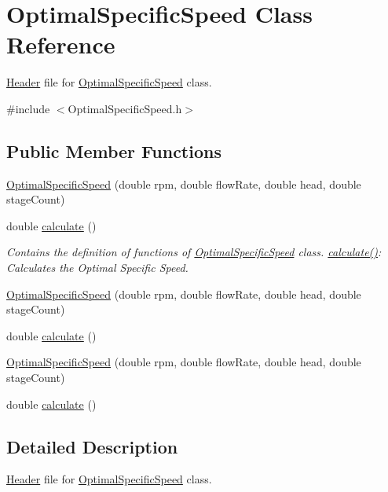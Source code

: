 \hypertarget{class_optimal_specific_speed}{}\section{Optimal\+Specific\+Speed Class Reference}
\label{class_optimal_specific_speed}


\hyperlink{class_header}{Header} file for \hyperlink{class_optimal_specific_speed}{Optimal\+Specific\+Speed} class.  




{\ttfamily \#include $<$Optimal\+Specific\+Speed.\+h$>$}

\subsection*{Public Member Functions}
\begin{DoxyCompactItemize}
\item 
\hyperlink{class_optimal_specific_speed_a3cd734e4ecd1a74cb0c25f14dc567eba}{Optimal\+Specific\+Speed} (double rpm, double flow\+Rate, double head, double stage\+Count)
\item 
double \hyperlink{class_optimal_specific_speed_a75c0c0d37edbff80744f2f6e7fe1f4e1}{calculate} ()
\begin{DoxyCompactList}\small\item\em Contains the definition of functions of \hyperlink{class_optimal_specific_speed}{Optimal\+Specific\+Speed} class. \hyperlink{class_optimal_specific_speed_a75c0c0d37edbff80744f2f6e7fe1f4e1}{calculate()}\+: Calculates the Optimal Specific Speed. \end{DoxyCompactList}\item 
\hyperlink{class_optimal_specific_speed_a3cd734e4ecd1a74cb0c25f14dc567eba}{Optimal\+Specific\+Speed} (double rpm, double flow\+Rate, double head, double stage\+Count)
\item 
double \hyperlink{class_optimal_specific_speed_a75c0c0d37edbff80744f2f6e7fe1f4e1}{calculate} ()
\item 
\hyperlink{class_optimal_specific_speed_a3cd734e4ecd1a74cb0c25f14dc567eba}{Optimal\+Specific\+Speed} (double rpm, double flow\+Rate, double head, double stage\+Count)
\item 
double \hyperlink{class_optimal_specific_speed_a75c0c0d37edbff80744f2f6e7fe1f4e1}{calculate} ()
\end{DoxyCompactItemize}


\subsection{Detailed Description}
\hyperlink{class_header}{Header} file for \hyperlink{class_optimal_specific_speed}{Optimal\+Specific\+Speed} class. 

